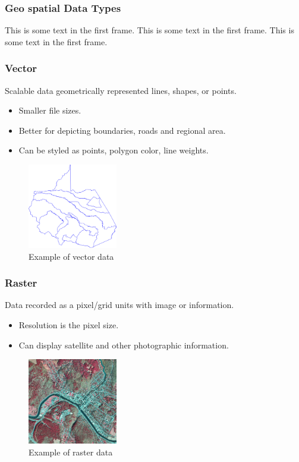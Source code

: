 \documentclass[8.5pt]{beamer}
\begin{document}
\begin{frame}
    \frametitle{Geo spatial Data Types}
    This is some text in the first frame. This is some text in the first frame. This is some text in the first frame.
\end{frame}

\begin{frame}
    \frametitle{Vector}
    Scalable data geometrically represented lines, shapes, or points.

    \begin{itemize}
        \item Smaller file sizes.
        \item Better for depicting boundaries, roads and regional area.
        \item Can be styled as points, polygon color, line weights.
    \end{itemize}

    \begin{figure}
        \centering
        \includegraphics[width=0.35\textwidth]{images/vector.png}
        \caption{Example of vector data}
        \label{fig:vector}
    \end{figure}

\end{frame}

\begin{frame}
    \frametitle{Raster}

    Data recorded as a pixel/grid units with image or information.

    \begin{itemize}
        \item Resolution is the pixel size.
        \item Can display satellite and other photographic information.
    \end{itemize}

    \begin{figure}
        \centering
        \includegraphics[width=0.35\textwidth]{images/raster.png}
        \caption{Example of raster data}
        \label{fig:raster}
    \end{figure}

\end{frame}
\end{document}
